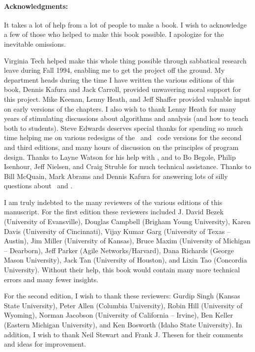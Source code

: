 
\paragraph{Acknowledgments:}
It takes a lot of help from a lot of people to make a book.
I wish to acknowledge a few of those who helped to make this
book possible.
I apologize for the inevitable omissions.

Virginia Tech helped make this whole thing possible through sabbatical
research leave during Fall 1994, enabling me to get the project
off the ground.
My department heads during the time I have written the various
editions of this book, Dennis Kafura and Jack Carroll, provided
unwavering moral support for this project.
Mike Keenan, Lenny Heath, and Jeff Shaffer provided valuable
input on early versions of the chapters.
I also wish to thank Lenny Heath for many years of stimulating
discussions about algorithms and analysis (and how to teach both to
students).
Steve Edwards deserves special thanks for spending so much time
helping me on various redesigns of the \LangCPP\ and \LangJava\ code versions
for the second and third editions,
and many hours of discussion on the principles of program design.
Thanks to Layne Watson for his help with \Mathematica,
and to Bo Begole, Philip Isenhour, Jeff Nielsen, and Craig Struble for
much technical assistance.
Thanks to Bill McQuain, Mark Abrams and Dennis Kafura for answering
lots of silly questions about \LangCPP\ and \LangJava.

I am truly indebted to the many reviewers of the various editions of this
man\-u\-script.
For the first edition these reviewers included
J. David Bezek (University of Ev\-ans\-ville),
Douglas Campbell (Brig\-ham Young University), 
Karen Davis (University of Cincinnati),
Vijay Kumar Garg (University of Texas -- Austin),
Jim Miller (University of Kansas),
Bruce Maxim (University of Michigan -- Dearborn),
Jeff Parker (Agile Net\-works/\-Har\-vard),
Dana Richards (George Mason University),
Jack Tan (University of Hou\-s\-ton),
and Lixin Tao (Concordia University).
Without their help, this book would contain many more technical errors
and many fewer insights.

For the second edition, I wish to thank these reviewers:
Gurdip Singh (Kansas State University),
Peter Allen (Columbia University),
Robin Hill (University of Wyoming),
Norman Jacobson (University of California -- Irvine),
Ben Keller (Eastern Michigan University), and
Ken Bosworth (Idaho State University).
In addition, I wish to thank Neil Stewart and Frank J. Thesen for
their comments and ideas for improvement.


